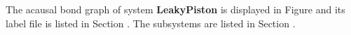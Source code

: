 

   The acausal bond graph of system \textbf{LeakyPiston} is
   displayed in Figure  and its label
   file is listed in Section .
   The subsystems are listed in Section .
